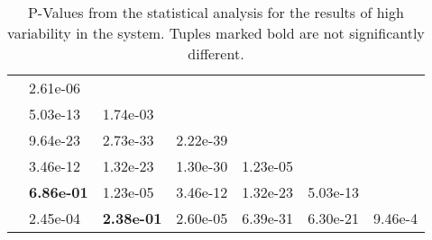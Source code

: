 \documentclass[envcountsame]{llncs}
\begin{document}
\begin{table}
\begin{center}
\begin{tabular}{lP{1.75cm}P{1.75cm}P{1.75cm}P{1.75cm}P{1.75cm}P{1.75cm}}
      \midrule
         & 2.61e-06          &                   &                   &           &           &             \\
         & 5.03e-13          & 1.74e-03          &                   &           &           &             \\
      \BILOne{}   & 9.64e-23          & 2.73e-33          & 2.22e-39          &           &           &             \\
      \BILTwo{}   & 3.46e-12          & 1.32e-23          & 1.30e-30          & 1.23e-05  &           &             \\
      \BILThree{} & \textbf{6.86e-01} & 1.23e-05          & 3.46e-12          & 1.32e-23  & 5.03e-13  &             \\
      \BILFour{}  & 2.45e-04          & \textbf{2.38e-01} & 2.60e-05          & 6.39e-31  & 6.30e-21  & 9.46e-4     \\
      \bottomrule
    \end{tabular}
  \end{center}
  \caption{\label{tbl:stats-exp}P-Values from the statistical analysis for the results of
    high variability in the system. Tuples marked bold are not significantly different.}
\end{table}
\end{document}
